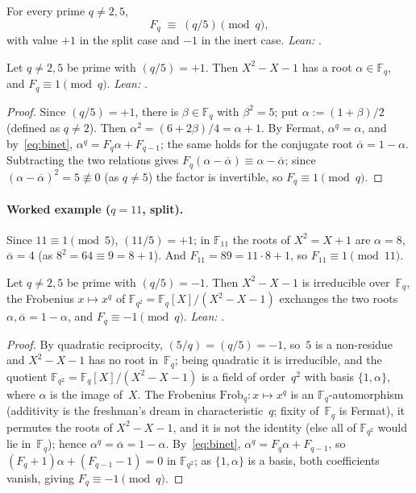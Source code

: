 \begin{Theorem}\label{thm:fib-main}
For every prime $q\neq2,5$,
\[
  F_{q}\;\equiv\;(q/5)\pmod{q},
\]
with value $+1$ in the split case and $-1$ in the inert case.
\emph{Lean:} .
\end{Theorem}

\begin{Lemma}\label{lem:fib-split}
Let $q\neq2,5$ be prime with $(q/5)=+1$.  Then $X^{2}-X-1$ has a root
$\alpha\in\mathbb{F}_{q}$, and $F_{q}\equiv 1\pmod{q}$.
\emph{Lean:} .
\end{Lemma}

\begin{proof}
Since $(q/5)=+1$, there is $\beta\in\mathbb{F}_{q}$ with $\beta^{2}=5$;
put $\alpha:=(1+\beta)/2$ (defined as $q\neq2$).  Then
$\alpha^{2}=(6+2\beta)/4=\alpha+1$.  By Fermat, $\alpha^{q}=\alpha$, and
by~\eqref{eq:binet}, $\alpha^{q}=F_{q}\alpha+F_{q-1}$; the same holds for
the conjugate root $\overline{\alpha}=1-\alpha$.  Subtracting the two
relations gives $F_{q}(\alpha-\overline{\alpha})\equiv
\alpha-\overline{\alpha}$; since
$(\alpha-\overline{\alpha})^{2}=5\not\equiv0$ (as $q\neq5$) the factor is
invertible, so $F_{q}\equiv1\pmod{q}$.
\end{proof}

\paragraph{Worked example ($q=11$, split).}
Since $11\equiv1\pmod5$, $(11/5)=+1$; in $\mathbb{F}_{11}$ the roots of
$X^{2}=X+1$ are $\alpha=8$, $\overline{\alpha}=4$ (as
$8^{2}=64\equiv9=8+1$).  And $F_{11}=89=11\cdot8+1$, so
$F_{11}\equiv1\pmod{11}$.

\begin{Lemma}\label{lem:fib-inert}
Let $q\neq2,5$ be prime with $(q/5)=-1$.  Then $X^{2}-X-1$ is
irreducible over~$\mathbb{F}_{q}$, the Frobenius $x\mapsto x^{q}$ of
$\mathbb{F}_{q^{2}}=\mathbb{F}_{q}[X]/(X^{2}-X-1)$ exchanges the two
roots $\alpha,\overline{\alpha}=1-\alpha$, and $F_{q}\equiv-1\pmod{q}$.
\emph{Lean:} .
\end{Lemma}

\begin{proof}
By quadratic reciprocity, $(5/q)=(q/5)=-1$, so~$5$ is a non-residue
and $X^{2}-X-1$ has no root in~$\mathbb{F}_{q}$; being quadratic it is
irreducible, and the quotient
$\mathbb{F}_{q^{2}}=\mathbb{F}_{q}[X]/(X^{2}-X-1)$ is a field of
order~$q^{2}$ with basis $\{1,\alpha\}$, where $\alpha$ is the image
of~$X$.  The Frobenius $\mathrm{Frob}_{q}\colon x\mapsto x^{q}$ is an
$\mathbb{F}_{q}$-automorphism (additivity is the freshman's dream in
characteristic~$q$; fixity of~$\mathbb{F}_{q}$ is Fermat), it permutes
the roots of $X^{2}-X-1$, and it is not the identity (else all of
$\mathbb{F}_{q^{2}}$ would lie in~$\mathbb{F}_{q}$); hence
$\alpha^{q}=\overline{\alpha}=1-\alpha$.  By~\eqref{eq:binet},
$\alpha^{q}=F_{q}\alpha+F_{q-1}$, so $(F_{q}+1)\alpha+(F_{q-1}-1)=0$ in
$\mathbb{F}_{q^{2}}$; as $\{1,\alpha\}$ is a basis, both coefficients
vanish, giving $F_{q}\equiv-1\pmod{q}$.
\end{proof}

